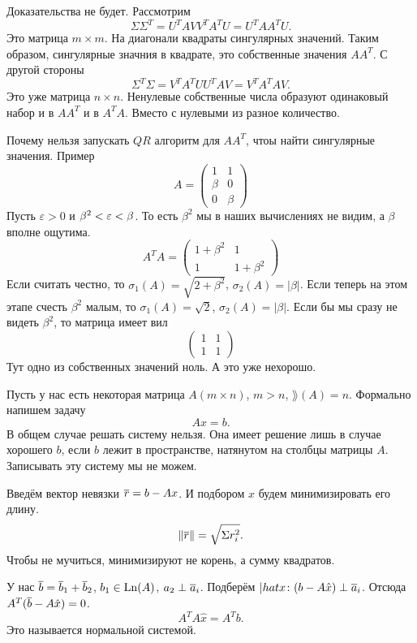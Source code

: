 Доказательства не будет. Рассмотрим
\[
  \Sigma \Sigma^T = U^T A V V^T A^T U = U^T A A^T U.
\]
Это матрица $m\times m$. На диагонали квадраты сингулярных значений. Таким образом, сингулярные значния в квадрате, это собственные значения $A A^T$. С другой стороны
\[
  \Sigma^T \Sigma = V^T A^T U U^T A V = V^T A^T A V.
\]
Это уже матрица $n\times n$. Ненулевые собственные числа образуют одинаковый набор и в $AA^T$ и в $A^TA$. Вместо с нулевыми из разное количество.


Почему нельзя запускать $QR$ алгоритм для $AA^T$, чтоы найти сингулярные значения. Пример
\[
  A = \begin{pmatrix}
  1 & 1\\
  \beta & 0\\
  0 & \beta
\end{pmatrix}
\]
Пусть $\varepsilon>0$ и $\beta^2<\varepsilon<\beta$. То есть $\beta^2$ мы в наших вычислениях не видим, а $\beta$ вполне ощутима.
\[
  A^T A = \begin{pmatrix}
1+\beta^2 & 1\\
1 & 1+ \beta^2
\end{pmatrix}
\]
Если считать честно, то $\sigma_1(A)= \sqrt{2+\beta^2}$, $\sigma_2(A) = |\beta|$. Если теперь на этом этапе счесть $\beta^2$ малым, то $\sigma_1(A) = \sqrt{2}$, $\sigma_2(A) = |\beta|$.
Если бы мы сразу не видеть $\beta^2$, то матрица имеет вил
\[
  \begin{pmatrix}
1 & 1\\
1 & 1
\end{pmatrix}
\]
Тут одно из собственных значений ноль. А это уже нехорошо.


Пусть у нас есть некоторая матрица $A(m\times n)$, $m>n$, $\rang(A)=n$. Формально напишем задачу
\[
  Ax = b.
\]
В общем случае решать систему нельзя. Она имеет решение лишь в случае хорошего $b$, если $b$ лежит в пространстве, натянутом на столбцы матрицы $A$. Записывать эту систему мы не можем.

Введём вектор невязки $\overline{r} = b - Ax$. И подбором $x$ будем минимизировать его длину.
\[
 \|\overline{r}\| = \sqrt{\Sigma r_i^2}.
\]
Чтобы не мучиться, минимизируют не корень, а сумму квадратов.

У нас $\overline{b} = \overline{b}_1 + \overline{b}_2$, $b_1\in \operatorname{Ln}(A)$, $a_2\perp \overline{a}_i$.
Подберём $|hat x\colon (b-A\hat x)\perp \overline{a}_i$. Отсюда $A^T(\overline{b} - A\hat x) = 0$.
\[
  A^T A \hat x = A^T b.
\]
Это называется нормальной системой.

